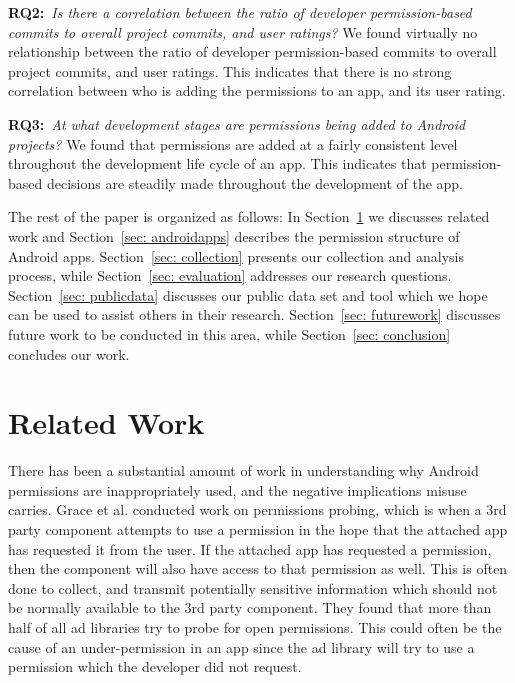\documentclass{sig-alternate-05-2015}
\begin{document}
\noindent
\textbf{RQ2:}~\emph{Is there a correlation between the ratio of developer permission-based commits to overall project commits, and user ratings?} We found virtually no relationship between the ratio of developer permission-based commits to overall project commits, and user ratings. This indicates that there is no strong correlation between who is adding the permissions to an app, and its user rating.


\noindent
\textbf{RQ3:}~\emph{At what development stages are permissions being added to Android projects?} We found that permissions are added at a fairly consistent level throughout the development life cycle of an app. This indicates that permission-based decisions are steadily made throughout the development of the app.


\newpage
The rest of the paper is organized as follows: In Section~\ref{sec: relatedworks} we discusses related work and Section~\ref{sec: androidapps} describes the permission structure of Android apps. Section~\ref{sec: collection} presents our collection and analysis process, while Section~\ref{sec: evaluation} addresses our research questions. Section~\ref{sec: publicdata} discusses our public data set and tool which we hope can be used to assist others in their research. Section~\ref{sec: futurework} discusses future work to be conducted in this area, while Section~\ref{sec: conclusion} concludes our work.


\section{Related Work}
\label{sec: relatedworks}

There has been a substantial amount of work in understanding why Android permissions are inappropriately used, and the negative implications misuse carries.  Grace et al.\cite{Grace:2012:UEA:2185448.2185464} conducted work on permissions probing, which is when a 3rd party component attempts to use a permission in the hope that the attached app has requested it from the user. If the attached app has requested a permission, then the component will also have access to that permission as well. This is often done to collect, and transmit potentially sensitive information which should not be normally available to the 3rd party component. They found that more than half of all ad libraries try to probe for open permissions. This could often be the cause of an under-permission in an app since the ad library will try to use a permission which the developer did not request.
\end{document}
